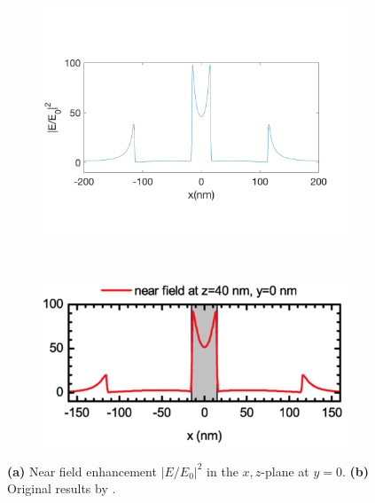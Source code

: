 \begin{figure}[!h]
  \centering
  \begin{subfigure}{0.45\textwidth}
    \includegraphics[width=\textwidth]{./images/40nm-y.png}
  \end{subfigure}
  ~
  \begin{subfigure}{0.45\textwidth}
    \includegraphics[width=\textwidth]{./images/heeg-y-line.png}
  \end{subfigure}
  \caption{\textbf{(a)} Near field enhancement $|E/E_0|^2$ in the $x,z$-plane at $y=0$. \textbf{(b)} Original results by \cite{heeg}.}
\end{figure}


\newpage
\null
